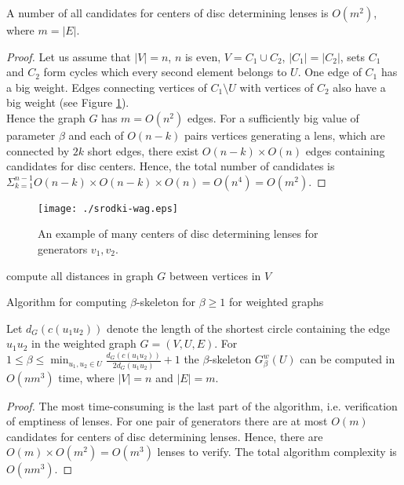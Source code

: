 \documentclass[11pt]{llncs}
\begin{document}
\begin{lemma}
A number of all candidates for centers of disc determining lenses is $O(m^2)$, where $m = |E|$.
\end{lemma}
\begin{proof}
Let us assume that $|V|=n$, $n$ is even, $V = C_1 \cup C_2$, $|C_1|=|C_2|$, sets $C_1$ and $C_2$ 
form cycles which every second element belongs to $U$. One edge of $C_1$ has a big weight.
Edges connecting vertices of $C_1 \setminus U$ with vertices of $C_2$ also have
a big weight (see Figure \ref{fig:sr-wag}). \\
Hence the graph $G$ has $m=O(n^2)$ edges.
For a sufficiently big value of parameter $\beta$ and each of $O(n-k)$ pairs vertices generating 
a lens, which are connected by $2k$ short edges, there exist $O(n-k) \times O(n)$ edges containing 
candidates for disc centers. Hence, the total number of candidates is 
$\Sigma_{k=1}^{n-1} O(n-k) \times O(n-k) \times O(n) = O(n^4)=O(m^2)$.
\end{proof} 


\begin{figure}[htbp]
\centering
\texttt{[image: ./srodki-wag.eps]}
\caption{ An example of many centers of disc determining lenses for generators $v_1, v_2$.}
\label{fig:sr-wag}
\end{figure}   


\begin{algorithm}[H]
\footnotesize{
\BlankLine
compute all distances in graph $G$ between vertices in $V$\;
}
\caption{Algorithm for computing $\beta$-skeleton for $\beta \geq 1$ for weighted graphs }  
\end{algorithm}  

\begin{theorem}
Let $d_G(c(u_1u_2))$ denote the length of the shortest circle containing the edge $u_1u_2$ 
in the weighted graph $G=(V,U,E)$.
For $1 \leq \beta \leq \min_{u_1,u_2 \in U} \frac{d_G(c(u_1u_2))}{2d_G(u_1u_2)}+1$
the $\beta$-skeleton $G_{\beta}^w(U)$ can be computed in $O(nm^3)$ time, where $|V|=n$ and $|E|=m$.
\end{theorem}
\begin{proof}
The most time-consuming is the last part of the algorithm, i.e. verification of emptiness of lenses.
For one pair of generators there are at most $O(m)$ candidates for centers of disc determining lenses.
Hence, there are $O(m) \times O(m^2)= O(m^3)$ lenses to verify. The total algorithm complexity
is $O(nm^3)$.
\end{proof}
\end{document}
